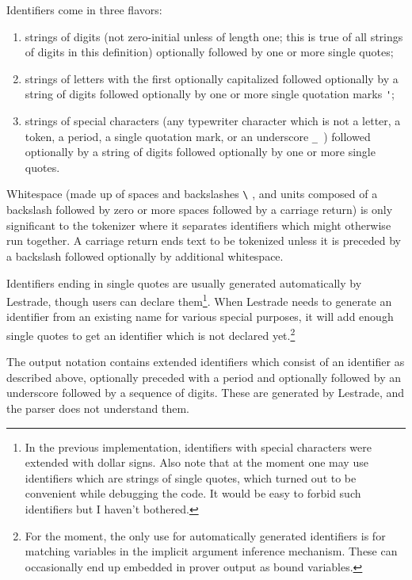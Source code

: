 \documentclass[12pt]{article}
\begin{document}
Identifiers come in three  flavors:  

\begin{enumerate}

\item strings of digits (not zero-initial unless of length one;  this is true of all strings of digits in this definition) optionally followed by one or more single quotes;  

\item strings of letters with the first optionally capitalized followed optionally by a string of digits followed optionally by one or more single quotation marks  \verb:':; 

\item strings of special characters
(any typewriter character which is not a letter, a token, a period, a single quotation mark, or an underscore \verb|_ |) followed optionally by a string of digits followed optionally by one or more single quotes.

\end{enumerate}

Whitespace (made up of spaces and backslashes \verb|\| , and units composed of a backslash followed by zero or more spaces followed by a carriage return)  is only significant to the tokenizer where it separates identifiers which might otherwise run together.   A carriage return ends text to be tokenized unless it is preceded by a backslash followed optionally by additional whitespace.

Identifiers ending in single quotes are usually generated automatically by Lestrade, though users can declare them\footnote{In the previous implementation, identifiers with special characters were extended with dollar signs. Also note that at the moment one may use identifiers which are strings of single quotes, which turned out to be convenient while debugging the code.  It would be easy to forbid such identifiers but I haven't bothered.}.  When Lestrade needs to generate an identifier from an existing name for various special purposes, it will add enough single quotes  to get an identifier which is not declared yet.\footnote{For the moment, the only use for automatically generated identifiers is for matching variables in the implicit argument inference mechanism.  These can occasionally end up embedded in prover output as bound variables.}

The output notation contains extended identifiers which consist of an identifier as described above, optionally preceded with a period and optionally followed by an underscore followed by a sequence of digits.  These are generated by Lestrade, and the parser does not understand them.
\end{document}
